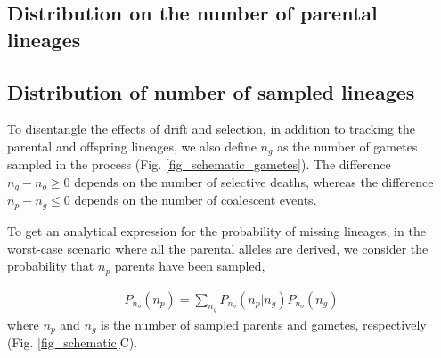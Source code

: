 \documentclass[9pt,twocolumn,twoside,lineno]{gsajnl}
\begin{document}
\subsection{Distribution on the number of parental lineages}



\subsection{Distribution of number of sampled lineages}
\label{parent_distribution}

To disentangle the effects of drift and selection, in addition to tracking the parental and
offspring lineages, we also define $n_g$ as the number of gametes sampled in the process (Fig.
\ref{fig_schematic_gametes}). The difference $n_g-n_o \ge 0$ depends on the number of selective
deaths, whereas the difference $n_p-n_g \le 0$ depends on the number of coalescent events.



%


To get an analytical expression for the probability of missing lineages, in the worst-case scenario
where all the parental alleles are derived, we consider the probability that $n_p$ parents have been
sampled,

\begin{equation}
  \begin{aligned}
    \label{eq_conditional}
    P_{n_o}(n_p) = \sum_{n_g} P_{n_o}(n_p | n_g)P_{n_o}(n_g)
  \end{aligned}
\end{equation}
where $n_p$ and $n_g$ is the number of sampled parents and gametes, respectively (Fig.
\ref{fig_schematic}C).
\end{document}
